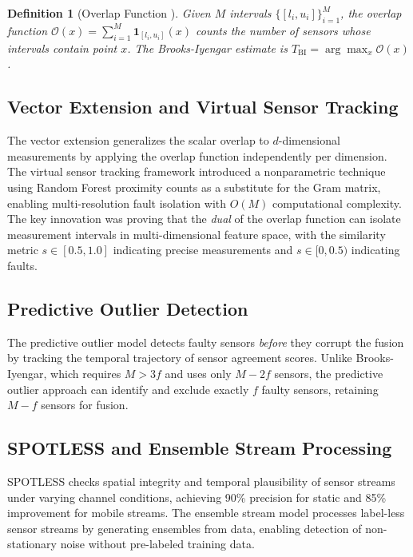 \documentclass[twocolumn,11pt]{article}
\newtheorem{definition}{Definition}
\begin{document}
\begin{definition}[Overlap Function \cite{brooks1996robust}]
Given $M$ intervals $\{[l_i, u_i]\}_{i=1}^M$, the overlap function
$\mathcal{O}(x) = \sum_{i=1}^{M} \mathbf{1}_{[l_i, u_i]}(x)$
counts the number of sensors whose intervals contain point $x$.
The Brooks-Iyengar estimate is
$\hat{T}_{\mathrm{BI}} = \arg\max_x \mathcal{O}(x)$.
\end{definition}

\subsection{Vector Extension and Virtual Sensor Tracking}

The vector extension \cite{iyer2013dissertation} generalizes the
scalar overlap to $d$-dimensional measurements by applying the
overlap function independently per dimension.
The virtual sensor tracking framework \cite{iyer2015virtual}
introduced a nonparametric technique using Random Forest proximity
counts as a substitute for the Gram matrix, enabling
multi-resolution fault isolation with $O(M)$ computational
complexity.
The key innovation was proving that the \textit{dual} of the
overlap function can isolate measurement intervals in
multi-dimensional feature space, with the similarity metric
$s \in [0.5, 1.0]$ indicating precise measurements and
$s \in [0, 0.5)$ indicating faults.

\subsection{Predictive Outlier Detection}

The predictive outlier model \cite{iyer2015virtual} detects faulty
sensors \textit{before} they corrupt the fusion by tracking the
temporal trajectory of sensor agreement scores.
Unlike Brooks-Iyengar, which requires $M > 3f$ and uses only
$M - 2f$ sensors, the predictive outlier approach can identify
and exclude exactly $f$ faulty sensors, retaining $M - f$ sensors
for fusion.

\subsection{SPOTLESS and Ensemble Stream Processing}

SPOTLESS \cite{iyer2013spotless} checks spatial integrity and
temporal plausibility of sensor streams under varying channel
conditions, achieving 90\% precision for static and 85\%
improvement for mobile streams.
The ensemble stream model \cite{iyer2013dissertation,iyer2015ai}
processes label-less sensor streams by generating ensembles from
data, enabling detection of non-stationary noise without
pre-labeled training data.
\end{document}
